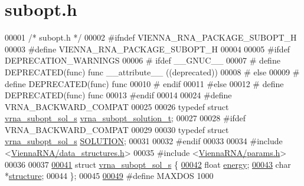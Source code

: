 \hypertarget{subopt_8h_source}{}\section{subopt.\+h}
\label{subopt_8h_source}

\begin{DoxyCode}
00001 \textcolor{comment}{/* subopt.h */}
00002 \textcolor{preprocessor}{#ifndef VIENNA\_RNA\_PACKAGE\_SUBOPT\_H}
00003 \textcolor{preprocessor}{#define VIENNA\_RNA\_PACKAGE\_SUBOPT\_H}
00004 
00005 \textcolor{preprocessor}{#ifdef DEPRECATION\_WARNINGS}
00006 \textcolor{preprocessor}{# ifdef \_\_GNUC\_\_}
00007 \textcolor{preprocessor}{#  define DEPRECATED(func) func \_\_attribute\_\_ ((deprecated))}
00008 \textcolor{preprocessor}{# else}
00009 \textcolor{preprocessor}{#  define DEPRECATED(func) func}
00010 \textcolor{preprocessor}{# endif}
00011 \textcolor{preprocessor}{#else}
00012 \textcolor{preprocessor}{# define DEPRECATED(func) func}
00013 \textcolor{preprocessor}{#endif}
00014 
00024 \textcolor{preprocessor}{#define VRNA\_BACKWARD\_COMPAT}
00025 
00026 \textcolor{keyword}{typedef} \textcolor{keyword}{struct }\hyperlink{structvrna__subopt__sol__s}{vrna\_subopt\_sol\_s}   \hyperlink{structvrna__subopt__sol__s}{vrna\_subopt\_solution\_t};
00027 
00028 \textcolor{preprocessor}{#ifdef VRNA\_BACKWARD\_COMPAT}
00029 
00030 \textcolor{keyword}{typedef} \textcolor{keyword}{struct }\hyperlink{structvrna__subopt__sol__s}{vrna\_subopt\_sol\_s}   \hyperlink{structvrna__subopt__sol__s}{SOLUTION};
00031 
00032 \textcolor{preprocessor}{#endif}
00033 
00034 \textcolor{preprocessor}{#include <\hyperlink{data__structures_8h}{ViennaRNA/data\_structures.h}>}
00035 \textcolor{preprocessor}{#include <\hyperlink{params_8h}{ViennaRNA/params.h}>}
00036 
00037 
\hypertarget{subopt_8h_source_l00041}{}\hyperlink{structvrna__subopt__sol__s}{00041} \textcolor{keyword}{struct }\hyperlink{structvrna__subopt__sol__s}{vrna\_subopt\_sol\_s} \{
\hypertarget{subopt_8h_source_l00042}{}\hyperlink{structvrna__subopt__sol__s_a99bc26ca68392aa4656386cf73b73fef}{00042}   \textcolor{keywordtype}{float} \hyperlink{structvrna__subopt__sol__s_a99bc26ca68392aa4656386cf73b73fef}{energy};       
\hypertarget{subopt_8h_source_l00043}{}\hyperlink{structvrna__subopt__sol__s_a3c632c7f08eb6a8827c6151625e5ef8e}{00043}   \textcolor{keywordtype}{char} *\hyperlink{structvrna__subopt__sol__s_a3c632c7f08eb6a8827c6151625e5ef8e}{structure};    
00044 \};
00045 
\hypertarget{subopt_8h_source_l00049}{}\hyperlink{subopt_8h_a5ec740b80afb4906ba4311dbd8ddbd89}{00049} \textcolor{preprocessor}{#define MAXDOS                1000}

\end{DoxyCode}
